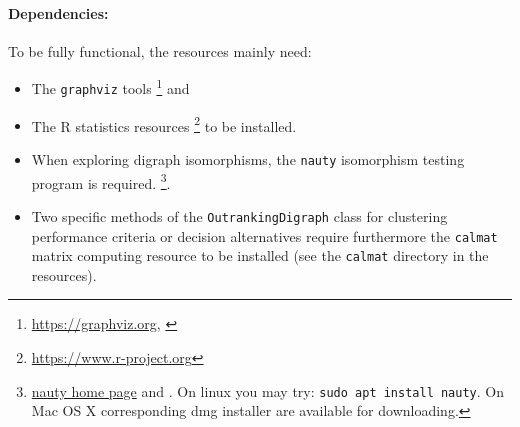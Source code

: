 \paragraph{Dependencies:}
To be fully functional, the \Digraph resources mainly need:
\begin{itemize}[leftmargin=0.5cm,listparindent=0em,rightmargin=0.2cm,nosep]
\item The \texttt{graphviz} tools \footnote{\href{https://graphviz.org}{https://graphviz.org}, \citet{graphViz}} and 
\item The R statistics resources \footnote{\href{https://www.r-project.org}{https://www.r-project.org}} to be installed.
\item When exploring digraph isomorphisms, the \texttt{nauty} isomorphism testing program is required. \footnote{\href{https://www.cs.sunysb.edu/~algorith/implement/nauty/implement.shtml}{nauty home page} and \citet{nauty}. On linux you may try: \texttt{sudo apt install nauty}. On Mac OS X corresponding dmg installer are available for downloading.}.
\item Two specific methods of the \texttt{OutrankingDigraph} class for clustering performance criteria or decision alternatives require furthermore the \texttt{calmat} matrix computing resource to be installed (see the \texttt{calmat} directory in the \Digraph resources).
\end{itemize}

